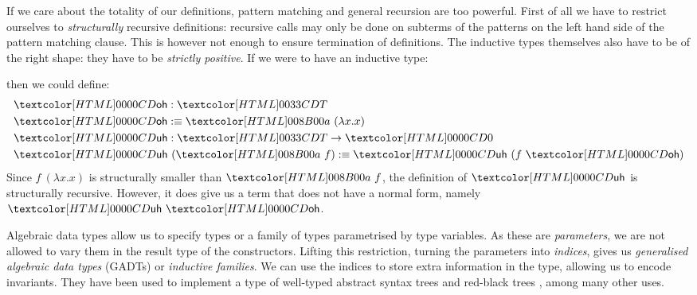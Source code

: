 If we care about the totality of our definitions, pattern matching and
general recursion are too powerful. First of all we have to restrict
ourselves to \emph{structurally} recursive definitions: recursive
calls may only be done on subterms of the patterns on the left hand
side of the pattern matching clause. This is however not enough to
ensure termination of definitions. The inductive types themselves also
have to be of the right shape: they have to be \emph{strictly
  positive}. If we were to have an inductive type:
%
\begin{datatype}{\Tty}{\Type}
  \constr{\Ta}{(\Tty \to \Tty) \to \Tty}
\end{datatype}
then we could define:
%
\begin{align*}
  &\oh : \Tty \\
  &\oh \ddefeq \Ta\ (\lambda x . x)
  \\
  &\uh : \Tty \to \emptyty \\
  &\uh\ (\Ta\ f) \ddefeq \uh\ (f\ \oh)
\end{align*}
%
Since $f\ (\lambda x . x)$ is structurally smaller than $\Ta\ f$, the
definition of $\uh$ is structurally recursive. However, it does give us
a term that does not have a normal form, namely $\uh\ \oh$.

Algebraic data types allow us to specify types or a family of types
parametrised by type variables. As these are \emph{parameters}, we are
not allowed to vary them in the result type of the
constructors. Lifting this restriction, \ie turning the parameters
into \emph{indices}, gives us \emph{generalised algebraic data types}
(GADTs) or \emph{inductive families}. We can use the indices to store
extra information in the type, allowing us to encode invariants. They
have been used to implement a type of well-typed abstract syntax trees
\cite{Pavsalic2004} and red-black trees \cite{Kahrs2001}, among many
other uses.

